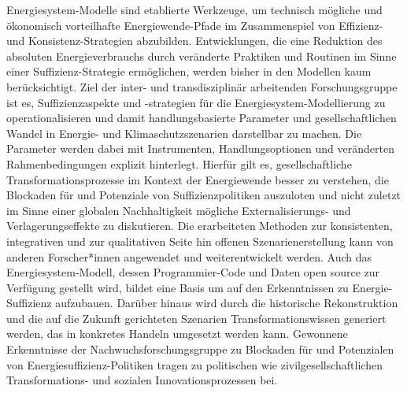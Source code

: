 Energiesystem-Modelle sind etablierte Werkzeuge, um technisch mögliche und ökonomisch vorteilhafte Energiewende-Pfade im Zusammenspiel von Effizienz- und Konsistenz-Strategien abzubilden. Entwicklungen, die eine Reduktion des absoluten Energieverbrauchs durch veränderte Praktiken und Routinen im Sinne einer Suffizienz-Strategie ermöglichen, werden bisher in den Modellen kaum berücksichtigt.
Ziel der inter- und transdisziplinär arbeitenden Forschungsgruppe ist es, Suffizienzaspekte und -strategien für die Energiesystem-Modellierung zu operationalisieren und damit handlungsbasierte Parameter und gesellschaftlichen Wandel in Energie- und Klimaschutzszenarien darstellbar zu machen. Die Parameter werden dabei mit Instrumenten, Handlungsoptionen und veränderten Rahmenbedingungen explizit hinterlegt. Hierfür gilt es, gesellschaftliche Transformationsprozesse im Kontext der Energiewende besser zu verstehen, die Blockaden für und Potenziale von Suffizienzpolitiken auszuloten und nicht zuletzt im Sinne einer globalen Nachhaltigkeit mögliche Externalisierungs- und Verlagerungseffekte zu diskutieren.
Die erarbeiteten Methoden zur konsistenten, integrativen und zur qualitativen Seite hin offenen Szenarienerstellung kann von anderen Forscher*innen angewendet und weiterentwickelt werden. Auch das Energiesystem-Modell, dessen Programmier-Code und Daten open source zur Verfügung gestellt wird, bildet eine Basis um auf den Erkenntnissen zu Energie-Suffizienz aufzubauen. Darüber hinaus wird durch die historische Rekonstruktion und die auf die Zukunft gerichteten Szenarien Transformationswissen generiert werden, das in konkretes Handeln umgesetzt werden kann. Gewonnene Erkenntnisse der Nachwuchsforschungsgruppe zu Blockaden für und Potenzialen von Energiesuffizienz-Politiken tragen zu politischen wie zivilgesellschaftlichen Transformations- und sozialen Innovationsprozessen bei.

